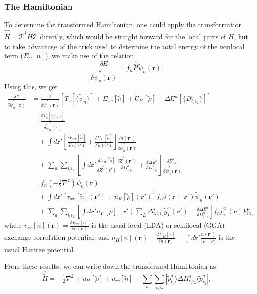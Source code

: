 \documentclass[a4paper]{article}
\newcommand{\s}[1]{\tilde{#1}}
\newcommand{\ws}[1]{\widetilde{#1}}
\newcommand{\wh}[1]{\widehat{#1}}
\newcommand{\br}{\mathbf{r}}
\newcommand{\T}{\hat{\mathcal{T}}}
\newcommand{\Ham}{\widehat{H}}
\newcommand{\bra}[1]{\langle #1 |}
\newcommand{\ket}[1]{| #1 \rangle}
\begin{document}
\subsubsection{The Hamiltonian}
To determine the transformed Hamiltonian, one could apply the
transformation $\wh{\ws{H}} = \T^\dagger \Ham \T$ directly, which
would be straight forward for the local parts of $\Ham$, but to take
advantage of the trick used to determine the total energy of the
nonlocal term ($E_C[n]$), we make use of the relation
%
\begin{equation}
  \frac{\delta E}{\delta \s{\psi}^*_n(\br)} = f_n \wh{\ws{H}} \s{\psi}_n(\br).
\end{equation}
%
Using this, we get
%
\begin{align*}
\frac{\delta E}{\delta \s{\psi}^*_n(\br)} &= \frac{\delta}{\delta \s{\psi}^*_n(\br)} \left[ T_s[\{\s{\psi}_n\}] + E_{xc}[\s{n}] + U_H[\s{\rho}] + \Delta E^a[\{D^a_{i_1i_2}\}]\right]\\
%
&= \frac{\delta T_s[\{\s{\psi}_n\}]}{\delta \s{\psi}^*_n(\br)} \\
&\quad + \int d\br' \left[ \frac{\delta E_{xc}[\s{n}]}{\delta \s{n}(\br')} + \frac{\delta U_H[\s{\rho}]}{\delta \s{n}(\br')} \right] \frac{\delta \s{n}(\br')}{\delta \s{\psi}^*_n(\br)}\\
&\quad + \sum_a \sum_{i_1i_2} \left[\int d\br' \frac{\delta U_H[\s{\rho}]}{\delta \s{Z}^a(\br')}\frac{\delta \s{Z}^a(\br')}{\delta D^a_{i_1i_2}} + \frac{\delta \Delta E^a}{\delta D^a_{i_1i_2}} \right]\frac{\delta D^a_{i_1i_2}}{\delta \s{\psi}^*_n(\br)}\\
%
&= f_n (-\tfrac{1}{2}\nabla^2)\psi_n(\br)\\
&\quad + \int d\br' \left[ v_{xc}[\s{n}](\br') + u_H[\s{\rho}](\br') \right] f_n \delta(\br-\br')\s{\psi}_n(\br')\\
&\quad + \sum_a \sum_{i_1i_2} \left[\int d\br' u_H[\s{\rho}](\br')\sum_L \Delta^a_{Li_1i_2}\s{g}^a_L(\br') + \frac{\delta \Delta E^a}{\delta D^a_{i_1i_2}} \right] f_n\s{p}^a_{i_1}(\br)P^a_{ni_2}
\end{align*}
%
where $v_{xc}[n](\br) = \frac{\delta E_{xc}[n]}{\delta n(\br)}$ is the
usual local (LDA) or semilocal (GGA) exchange correlation potential,
and $u_H[n](\br) = \frac{\delta U_H[n]}{\delta n(\br)} = \int d\br'
\frac{n(\br')}{|\br-\br'|}$ is the usual Hartree potential.
\par From these results, we can write down the transformed Hamiltonian as
%
\begin{equation}
  \wh{\ws{H}} = -\tfrac{1}{2}\nabla^2 + u_H[\s{\rho}] + v_{xc}[\s{n}] + \sum_a \sum_{i_1i_2} \ket{\s{p}^a_{i_1}} \Delta H^a_{i_1i_2} \bra{\s{p}^a_{i_2}},
\end{equation}
\end{document}
